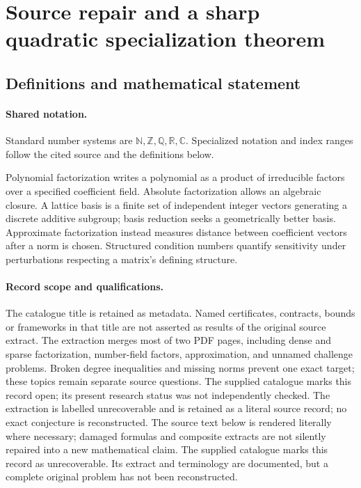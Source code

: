\documentclass[11pt]{article}
\begin{document}
\section{Source repair and a sharp quadratic specialization theorem}\label{statement}

\subsection{Definitions and mathematical statement}

\paragraph{Shared notation.}Standard number systems are $\mathbb N,\mathbb Z,\mathbb Q,\mathbb R,\mathbb C$. Specialized notation and index ranges follow the cited source and the definitions below.


Polynomial factorization writes a polynomial as a product of irreducible factors over a specified coefficient field. Absolute factorization allows an algebraic closure. A lattice basis is a finite set of independent integer vectors generating a discrete additive subgroup; basis reduction seeks a geometrically better basis. Approximate factorization instead measures distance between coefficient vectors after a norm is chosen. Structured condition numbers quantify sensitivity under perturbations respecting a matrix's defining structure.
\paragraph{Record scope and qualifications.}
The catalogue title is retained as metadata. Named certificates, contracts, bounds or frameworks in that title are not asserted as results of the original source extract.
The extraction merges most of two PDF pages, including dense and sparse factorization, number-field factors, approximation, and unnamed challenge problems. Broken degree inequalities and missing norms prevent one exact target; these topics remain separate source questions. The supplied catalogue marks this record open; its present research status was not independently checked. The extraction is labelled unrecoverable and is retained as a literal source record; no exact conjecture is reconstructed.
The source text below is rendered literally where necessary; damaged formulas and composite extracts are not silently repaired into a new mathematical claim.
The supplied catalogue marks this record as unrecoverable. Its extract and terminology are documented, but a complete original problem has not been reconstructed.
\end{document}
